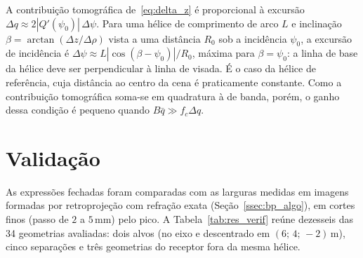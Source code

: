 \documentclass[12pt,a4paper,oneside]{book}
\theoremstyle{remark}
\theoremstyle{plain}
\theoremstyle{definition}
\begin{document}
A contribuição tomográfica de~\eqref{eq:delta_z} é proporcional à excursão
$\Delta q\approx2|Q'(\psi_0)|\,\Delta\psi$. Para uma hélice de comprimento de
arco $L$ e inclinação $\beta=\arctan(\Delta z/\Delta\rho)$ vista a uma
distância $R_0$ sob a incidência $\psi_0$, a excursão de incidência é
$\Delta\psi\approx L|\cos(\beta-\psi_0)|/R_0$, máxima para $\beta=\psi_0$:
a linha de base da hélice deve ser perpendicular à linha de visada. É o caso da
hélice de referência, cuja distância ao centro da cena é praticamente
constante. Como a contribuição tomográfica soma-se em quadratura à de banda,
porém, o ganho dessa condição é pequeno quando $B\bar q\gg f_c\Delta q$.

\section{Validação}
\label{sec:res_valid}

As expressões fechadas foram comparadas com as larguras medidas em imagens
formadas por retroprojeção com refração exata (Seção~\ref{ssec:bp_algo}), em
cortes finos (passo de $2$ a $5\,$mm) pelo pico. A
Tabela~\ref{tab:res_verif} reúne dezesseis das 34 geometrias avaliadas: dois
alvos (no eixo e descentrado em $(6;\,4;\,-2)\,$m), cinco separações e três
geometrias do receptor fora da mesma hélice.
\end{document}
